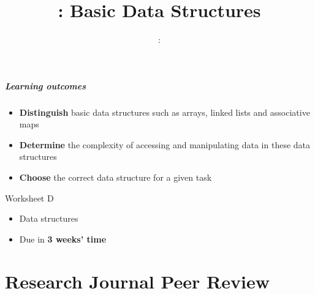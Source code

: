 \usepackage{../../beamerthemeFalmouthGamesAcademy}
\usepackage{multimedia}
\graphicspath{ {../../} }

\lstset{language=Python
}

\usepackage[normalem]{ulem}
\usepackage{wasysym}

\usepackage{algpseudocode}

\usepackage{pdfpages}

\usetikzlibrary{arrows,automata}
\usetikzlibrary{tikzmark,calc}




\title{\sessionnumber: Basic Data Structures}
\subtitle{\modulecode: \moduletitle}

\frame{\titlepage} 

\begin{frame}
	\frametitle{Learning outcomes}
	\begin{itemize}
      \item \textbf{Distinguish} basic data structures such as arrays, linked lists and associative maps
      \item \textbf{Determine} the complexity of accessing and manipulating data in these data structures
      \item \textbf{Choose} the correct data structure for a given task
	\end{itemize}
\end{frame}

\begin{frame}{Worksheet D}
	\begin{itemize}
		\item Data structures
		\item Due in \textbf{3 weeks' time}
	\end{itemize}
\end{frame}

\part{Research Journal Peer Review}
\frame{\partpage}





